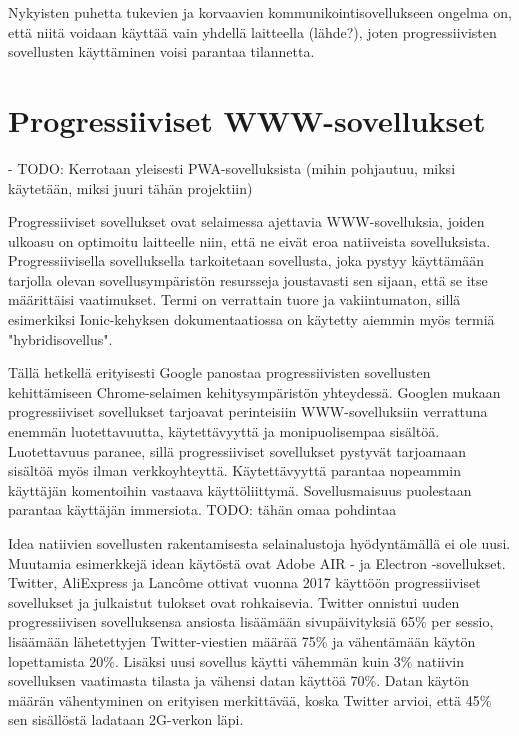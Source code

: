 \documentclass[utf8]{gradu3}
\begin{document}
Nykyisten puhetta tukevien ja korvaavien kommunikointisovellukseen ongelma on, että niitä voidaan käyttää vain yhdellä laitteella (lähde?), joten progressiivisten sovellusten käyttäminen voisi parantaa tilannetta.

\section{Progressiiviset WWW-sovellukset}

- TODO: Kerrotaan yleisesti PWA-sovelluksista (mihin pohjautuu, miksi käytetään, miksi juuri tähän projektiin)

Progressiiviset sovellukset ovat selaimessa ajettavia WWW-sovelluksia, joiden ulkoasu on optimoitu laitteelle niin, että ne eivät eroa natiiveista sovelluksista. Progressiivisella sovelluksella tarkoitetaan sovellusta, joka pystyy käyttämään tarjolla olevan sovellusympäristön resursseja joustavasti sen sijaan, että se itse määrittäisi vaatimukset. Termi on verrattain tuore ja vakiintumaton, sillä esimerkiksi Ionic-kehyksen dokumentaatiossa on käytetty aiemmin myös termiä "hybridisovellus".

Tällä hetkellä erityisesti Google panostaa progressiivisten sovellusten kehittämiseen Chrome-selaimen kehitysympäristön yhteydessä. Googlen mukaan progressiiviset sovellukset tarjoavat perinteisiin WWW-sovelluksiin verrattuna enemmän luotettavuutta, käytettävyyttä ja monipuolisempaa sisältöä. Luotettavuus paranee, sillä progressiiviset sovellukset pystyvät tarjoamaan sisältöä myös ilman verkkoyhteyttä. Käytettävyyttä parantaa nopeammin käyttäjän komentoihin vastaava käyttöliittymä. Sovellusmaisuus puolestaan parantaa käyttäjän immersiota. \parencite[]{google-pwa-marketing}
TODO: tähän omaa pohdintaa

Idea natiivien sovellusten rakentamisesta selainalustoja hyödyntämällä ei ole uusi. Muutamia esimerkkejä idean käytöstä ovat Adobe AIR - ja Electron -sovellukset. Twitter, AliExpress ja Lancôme ottivat vuonna 2017 käyttöön progressiiviset sovellukset ja julkaistut tulokset ovat rohkaisevia. Twitter onnistui uuden progressiivisen sovelluksensa ansiosta lisäämään sivupäivityksiä 65\% per sessio, lisäämään lähetettyjen Twitter-viestien määrää 75\% ja vähentämään käytön lopettamista 20\%. Lisäksi uusi sovellus käytti vähemmän kuin 3\% natiivin sovelluksen vaatimasta tilasta ja vähensi datan käyttöä 70\%. Datan käytön määrän vähentyminen on erityisen merkittävää, koska Twitter arvioi, että 45\% sen sisällöstä ladataan 2G-verkon läpi. \parencite[]{beginners-guide-pwa}
\end{document}
